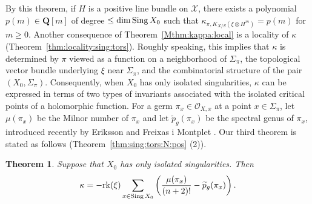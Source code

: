 \documentclass[amscd, leqno]{amsart}
\theoremstyle{plain}
\newtheorem{theorem}{Theorem}[section]
\theoremstyle{definition}
\theoremstyle{remark}
\begin{document}
By this theorem, if $H$ is a positive line bundle on ${\mathcal X}$, there exists a polynomial $p(m) \in {\mathbf Q}[m]$
of degree $\leq \dim {\rm Sing}\,X_{0}$ such that $\kappa_{\pi, K_{X/S}(\xi\otimes H^{m})} = p(m)$ for $m \geq 0$.
Another consequence of Theorem~\ref{Mthm:kappa:local} is a locality of $\kappa$ (Theorem~\ref{thm:locality:sing:tors}). 
Roughly speaking, this implies that $\kappa$ is determined
by $\pi$ viewed as a function on a neighborhood of $\Sigma_{\pi}$, the topological vector bundle underlying $\xi$ near $\Sigma_{\pi}$, 
and the combinatorial structure of the pair $(X_{0}, \Sigma_{\pi})$.
Consequently, when $X_{0}$ has only isolated singularities, $\kappa$ can be expressed in terms of two types of invariants associated with 
the isolated critical points of a holomorphic function. 
For a germ $\pi_{x} \in {\mathcal O}_{X,x}$ at a point $x \in \Sigma_{\pi}$,
let $\mu(\pi_{x})$ be the Milnor number of $\pi_{x}$ and let $\widetilde{p}_{g}(\pi_{x})$ be the spectral genus of $\pi_{x}$, introduced recently 
by Eriksson and Freixas i Montplet \cite{ErikssonFreixas26}. 
Our third theorem is stated as follows (Theorem~\ref{thm:sing:tors:N:pos} (2)).


\begin{theorem}
\label{Mthm:kappa:IHS}
Suppose that $X_{0}$ has only isolated singularities. Then 
$$
\kappa = -{\rm rk}(\xi) \sum_{x\in {\rm Sing}\,X_{0}} \left( \frac{\mu(\pi_{x})}{(n+2)!} - \widetilde{p}_{g}(\pi_{x}) \right).
$$
\end{theorem}
\end{document}

